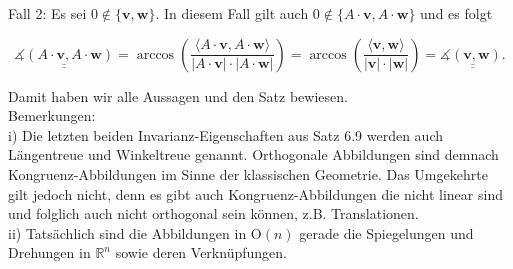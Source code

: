 \documentclass[10pt]{article}
\begin{document}
Fall 2: Es sei $0 \notin\{\mathbf{v}, \mathbf{w}\}$. In diesem Fall gilt auch $0 \notin\{A \cdot \mathbf{v}, A \cdot \mathbf{w}\}$ und es folgt


\begin{equation*}
\underline{\underline{\measuredangle(A \cdot \mathbf{v}, A \cdot \mathbf{w})}}=\arccos \left(\frac{\langle A \cdot \mathbf{v}, A \cdot \mathbf{w}\rangle}{|A \cdot \mathbf{v}| \cdot|A \cdot \mathbf{w}|}\right)=\arccos \left(\frac{\langle\mathbf{v}, \mathbf{w}\rangle}{|\mathbf{v}| \cdot|\mathbf{w}|}\right)=\underline{\underline{\measuredangle(\mathbf{v}, \mathbf{w}) .}} \tag{6.73}
\end{equation*}


Damit haben wir alle Aussagen und den Satz bewiesen.\\
Bemerkungen:\\
i) Die letzten beiden Invarianz-Eigenschaften aus Satz 6.9 werden auch Längentreue und Winkeltreue genannt. Orthogonale Abbildungen sind demnach Kongruenz-Abbildungen im Sinne der klassischen Geometrie. Das Umgekehrte gilt jedoch nicht, denn es gibt auch Kongruenz-Abbildungen die nicht linear sind und folglich auch nicht orthogonal sein können, z.B. Translationen.\\
ii) Tatsächlich sind die Abbildungen in $\mathrm{O}(n)$ gerade die Spiegelungen und Drehungen in $\mathbb{R}^{n}$ sowie deren Verknüpfungen.
\end{document}
